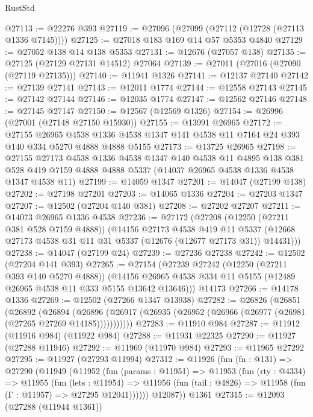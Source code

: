 \begin{lexlean}{RustStd}
\begin{coremodule}
@27113 := @22276 @393
@27119 := @27096 (@27099 (@27112 (@12728 (@27113 @1336 @7145))))
@27125 := @27018 @183 @169 @14 @57 @5353 @4840
@27129 := @27052 @138 @14 @138 @5353
@27131 := @12676 (@27057 @138)
@27135 := @27125 (@27129 @27131 @14512) @27064
@27139 := @27011 (@27016 (@27090 (@27119 @27135)))
@27140 := @11941 @1326
@27141 := @12137 @27140
@27142 := @27139 @27141
@27143 := @12011 @1774
@27144 := @12558 @27143
@27145 := @27142 @27144
@27146 := @12035 @1774
@27147 := @12562 @27146
@27148 := @27145 @27147
@27150 := @12567 (@12569 @1326)
@27154 := @26996 (@27001 (@27148 @27150 @15930))
@27155 := @13991 @26965
@27172 := @27155
    @26965
    @4538
    @1336
    @4538
    @1347
    @141
    @4538
    @11
    @7164
    @24
    @393
    @140
    @334
    @5270
    @4888
    @4888
    @5155
@27173 := @13725 @26965
@27198 := @27155
    @27173
    @4538
    @1336
    @4538
    @1347
    @140
    @4538
    @11
    @4895
    @138
    @381
    @528
    @419
    @7159
    @4888
    @4888
    @5337
    (@14037 @26965 @4538 @1336 @4538 @1347 @4538 @11)
@27199 := @14059 @1347
@27201 := @14047 (@27199 @138)
@27202 := @27198 @27201
@27203 := @14065 @1336
@27204 := @27203 @1347
@27207 := @12502 (@27204 @140 @381)
@27208 := @27202 @27207
@27211 := @14073 @26965 @1336 @4538
@27236 := @27172
    (@27208
      (@12250 (@27211 @381 @528 @7159 @4888))
      (@14156
        @27173
        @4538
        @419
        @11
        @5337
        (@12668 @27173 @4538 @31 @11 @31 @5337 (@12676 (@12677 @27173 @31)) @14431)))
@27238 := @14047 (@27199 @24)
@27239 := @27236 @27238
@27242 := @12502 (@27204 @141 @393)
@27265 := @27154
    (@27239
      @27242
      (@12250 (@27211 @393 @140 @5270 @4888))
      (@14156 @26965 @4538 @334 @11 @5155 (@12489 @26965 @4538 @11 @333 @5155 @13642 @13646)))
    @14173
@27266 := @14178 @1336
@27269 := @12502 (@27266 @1347 @13938)
@27282 := @26826
    (@26851
      (@26892
        (@26894
          (@26896 (@26917 (@26935 (@26952 (@26966 (@26977 (@26981 (@27265 @27269 @14185)))))))))))
@27283 := @11910 @984
@27287 := @11912 (@11916 @984) (@11922 @984)
@27288 := @11931 @22325
@27290 := @11927 (@27288 @11946)
@27292 := @11969 (@11970 @984)
@27293 := @11965 @27292
@27295 := @11927 (@27293 @11994)
@27312 := @11926
    (fun (fn : @131) =>
    @27290
      (@11949
        (@11952
          (fun (params : @11951) =>
          @11953
            (fun (rty : @4334) =>
            @11955
              (fun (lets : @11954) =>
              @11956 (fun (tail : @4826) => @11958 (fun (Γ : @11957) => @27295 @12041))))))
        @12087))
    @1361
@27315 := @12093 (@27288 (@11944 @1361))

\end{coremodule}
\end{lexlean}
